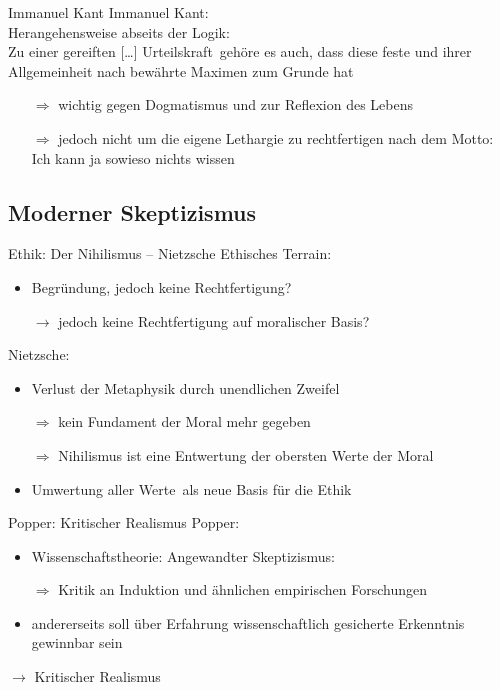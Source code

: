 \documentclass[12pt]{beamer}
\begin{document}
\begin{frame}{Immanuel Kant}
Immanuel Kant:\\
Herangehensweise abseits der Logik:\\
Zu einer  \glqq gereiften [\ldots] Urteilskraft\grqq\ gehöre es auch, dass diese \glqq feste und ihrer Allgemeinheit nach bewährte Maximen zum Grunde hat\grqq
\begin{itemize}
\item[$\Rightarrow$] wichtig gegen Dogmatismus und zur Reflexion des Lebens
\item[$\Rightarrow$] jedoch nicht um die eigene Lethargie zu rechtfertigen nach dem Motto:\\
\glqq Ich kann ja sowieso nichts wissen\grqq
\end{itemize}
\end{frame}

\subsection{Moderner Skeptizismus}
\begin{frame}{Ethik: Der Nihilismus – Nietzsche}
Ethisches Terrain:\\
\begin{itemize}
\item Begründung, jedoch keine Rechtfertigung?
\item[$\rightarrow$] jedoch keine Rechtfertigung auf moralischer Basis?
\end{itemize}
Nietzsche:\\
\begin{itemize}
\item Verlust der Metaphysik durch unendlichen Zweifel
\item[$\Rightarrow$] kein Fundament der Moral mehr gegeben
\item[$\Rightarrow$] Nihilismus ist eine Entwertung der obersten Werte der Moral
\item \glqq Umwertung aller Werte\grqq\ als neue Basis für die Ethik
\end{itemize}
\end{frame}


\begin{frame}{Popper: Kritischer Realismus}
Popper:\\
\begin{itemize}
\item Wissenschaftstheorie: Angewandter Skeptizismus:
\item[$\Rightarrow$] Kritik an Induktion und ähnlichen empirischen Forschungen
\item andererseits soll über Erfahrung wissenschaftlich gesicherte Erkenntnis gewinnbar sein
\end{itemize}
$\rightarrow$ \glqq Kritischer Realismus\grqq
\end{frame}
\end{document}
